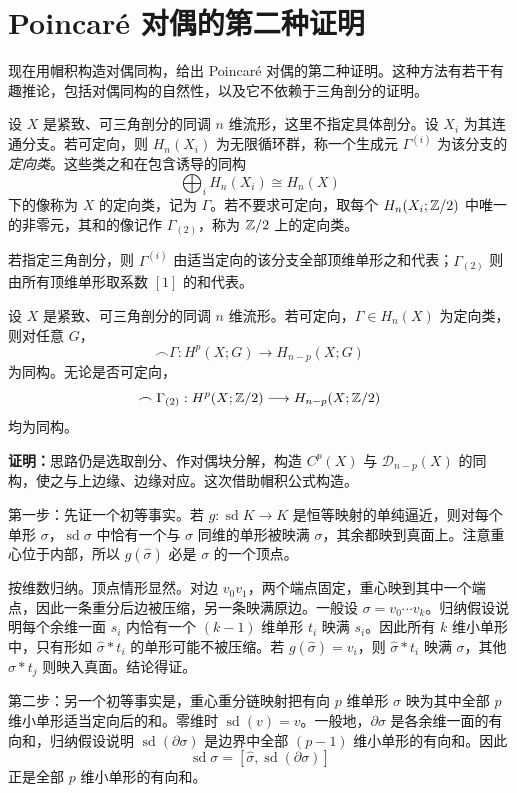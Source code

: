 \section{Poincaré 对偶的第二种证明}
现在用帽积构造对偶同构，给出 Poincaré 对偶的第二种证明。这种方法有若干有趣推论，包括对偶同构的自然性，以及它不依赖于三角剖分的证明。

设 $X$ 是紧致、可三角剖分的同调 $n$ 维流形，这里不指定具体剖分。设 $X_i$ 为其连通分支。若可定向，则 $H_n(X_i)$ 为无限循环群，称一个生成元 $\Gamma^{(i)}$ 为该分支的\emph{定向类}。这些类之和在包含诱导的同构
\[\bigoplus_i H_n(X_i)\cong H_n(X)\]
下的像称为 $X$ 的定向类，记为 $\Gamma$。若不要求可定向，取每个 $H_n(X_i;\mathbb{Z}/2)$ 中唯一的非零元，其和的像记作 $\Gamma_{(2)}$，称为 $\mathbb{Z}/2$ 上的定向类。

若指定三角剖分，则 $\Gamma^{(i)}$ 由适当定向的该分支全部顶维单形之和代表；$\Gamma_{(2)}$ 则由所有顶维单形取系数 $[1]$ 的和代表。

设 $X$ 是紧致、可三角剖分的同调 $n$ 维流形。若可定向，$\Gamma\in H_n(X)$ 为定向类，则对任意 $G$，
\[\frown\Gamma:H^p(X;G)\longrightarrow H_{n-p}(X;G)\]
为同构。无论是否可定向，
\[\frown\Gamma_{(2)}:H^p(X;\mathbb{Z}/2)\longrightarrow H_{n-p}(X;\mathbb{Z}/2)\]
均为同构。

\textbf{证明：}思路仍是选取剖分、作对偶块分解，构造 $C^p(X)$ 与 $\mathcal D_{n-p}(X)$ 的同构，使之与上边缘、边缘对应。这次借助帽积公式构造。

第一步：先证一个初等事实。若 $g:\operatorname{sd}K\to K$ 是恒等映射的单纯逼近，则对每个单形 $\sigma$，$\operatorname{sd}\sigma$ 中恰有一个与 $\sigma$ 同维的单形被映满 $\sigma$，其余都映到真面上。注意重心位于内部，所以 $g(\widehat\sigma)$ 必是 $\sigma$ 的一个顶点。

按维数归纳。顶点情形显然。对边 $v_0v_1$，两个端点固定，重心映到其中一个端点，因此一条重分后边被压缩，另一条映满原边。一般设 $\sigma=v_0\cdots v_k$。归纳假设说明每个余维一面 $s_i$ 内恰有一个 $(k-1)$ 维单形 $t_i$ 映满 $s_i$。因此所有 $k$ 维小单形中，只有形如 $\widehat\sigma*t_i$ 的单形可能不被压缩。若 $g(\widehat\sigma)=v_i$，则 $\widehat\sigma*t_i$ 映满 $\sigma$，其他 $\widehat\sigma*t_j$ 则映入真面。结论得证。

第二步：另一个初等事实是，重心重分链映射把有向 $p$ 维单形 $\sigma$ 映为其中全部 $p$ 维小单形适当定向后的和。零维时 $\operatorname{sd}(v)=v$。一般地，$\partial\sigma$ 是各余维一面的有向和，归纳假设说明 $\operatorname{sd}(\partial\sigma)$ 是边界中全部 $(p-1)$ 维小单形的有向和。因此
\[\operatorname{sd}\sigma=[\widehat\sigma,\operatorname{sd}(\partial\sigma)]\]
正是全部 $p$ 维小单形的有向和。

